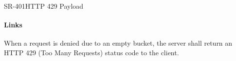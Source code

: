 \begin{softwarerequirement}{SR-401}{HTTP 429 Payload}
\paragraph{Links} 

When a request is denied due to an empty bucket,
the server shall return an HTTP 429 (Too Many Requests) status code to the client.
\end{softwarerequirement}